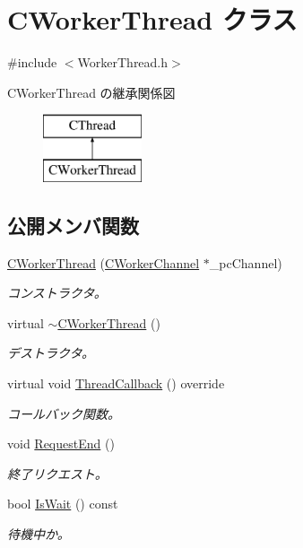\hypertarget{class_c_worker_thread}{}\section{C\+Worker\+Thread クラス}
\label{class_c_worker_thread}


{\ttfamily \#include $<$Worker\+Thread.\+h$>$}

C\+Worker\+Thread の継承関係図\begin{figure}[H]
\begin{center}
\leavevmode
\includegraphics[height=2.000000cm]{class_c_worker_thread}
\end{center}
\end{figure}
\subsection*{公開メンバ関数}
\begin{DoxyCompactItemize}
\item 
\hyperlink{class_c_worker_thread_a2c011a29dc6d6f5c0b40c09ed4f322b2}{C\+Worker\+Thread} (\hyperlink{class_c_worker_channel}{C\+Worker\+Channel} $\ast$\+\_\+pc\+Channel)
\begin{DoxyCompactList}\small\item\em コンストラクタ。 \end{DoxyCompactList}\item 
virtual \hyperlink{class_c_worker_thread_ac48e79f7cc0c6fa81c2600d79142a2d4}{$\sim$\+C\+Worker\+Thread} ()
\begin{DoxyCompactList}\small\item\em デストラクタ。 \end{DoxyCompactList}\item 
virtual void \hyperlink{class_c_worker_thread_ac41c89ce50bb4f499f2d5154a8db5a0f}{Thread\+Callback} () override
\begin{DoxyCompactList}\small\item\em コールバック関数。 \end{DoxyCompactList}\item 
void \hyperlink{class_c_worker_thread_a670abeb8365dc320b291d97e7ea850b2}{Request\+End} ()
\begin{DoxyCompactList}\small\item\em 終了リクエスト。 \end{DoxyCompactList}\item 
bool \hyperlink{class_c_worker_thread_a24c5e2381a0090c85e900558ee0b751a}{Is\+Wait} () const 
\begin{DoxyCompactList}\small\item\em 待機中か。 \end{DoxyCompactList}\end{DoxyCompactItemize}
